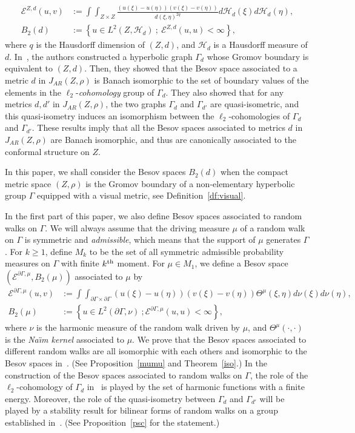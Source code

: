 \documentclass[AHL,Unicode,longabstracts,published]{cedram}
\newcommand{\ce}{\mathcal{E}}
\newcommand{\ch}{\mathcal{H}}
\begin{document}
\begin{align*}
\ce^{Z,d}(u,v)&:=\int\int_{Z\times Z}\frac{(u(\xi)-u(\eta))(v(\xi)-v(\eta))}{d(\xi,\eta)^{2q}} d\ch_{d}(\xi)d\ch_{d}(\eta),\\
B_2(d)&:=\left\{u\in L^2(Z,\ch_{d})\ ;\ \ce^{Z,d}(u,u)<\infty\right\},
\end{align*}
where $q$ is the Hausdorff dimension of $(Z,d)$, and $\ch_{d}$ is a Hausdorff measure of $d$. In~\cite{BP}, the authors constructed a hyperbolic graph $\Gamma_{d}$ whose Gromov boundary is equivalent to $(Z,d)$. Then, they showed that the Besov space associated to a metric $d$ in $J_{AR}(Z,\rho)$ is Banach isomorphic to the set of boundary values of the elements in the $\ell_2$-\emph{cohomology} group of $\Gamma_{d}$. They also showed that for any metrics $d,d'$ in $J_{AR}(Z,\rho)$, the two graphs $\Gamma_{d}$ and $\Gamma_{d'}$ are quasi-isometric, and this quasi-isometry induces an isomorphism between the $\ell_2$-cohomologies of $\Gamma_{d}$ and $\Gamma_{d'}$. These results imply that all the Besov spaces associated to metrics $d$ in $J_{AR}(Z,\rho)$ are Banach isomorphic, and thus are canonically associated to the conformal structure on $Z$.



In this paper, we shall consider the Besov spaces $B_2(d)$ when the compact metric space $(Z,\rho)$ is the Gromov boundary of a non-elementary hyperbolic group $\Gamma$ equipped with a visual metric, see Definition~\ref{df:visual}.


In the first part of this paper, we also define Besov spaces associated to random walks on $\Gamma$. We will always assume that the driving measure $\mu$ of a random walk on $\Gamma$ is symmetric and \emph{admissible}, which means that the support of $\mu$ generates $\Gamma$. For $k\geq1$, define $M_k$ to be the set of all symmetric admissible probability measures on $\Gamma$ with finite $k^{\rm th}$ moment. For $\mu\in M_1$, we define a Besov space $(\ce^{\partial\Gamma,\mu},B_2(\mu))$ associated to $\mu$ by
\begin{align*}
\ce^{\partial\Gamma,\mu}(u,v)&:=\int\int_{\partial\Gamma\times \partial\Gamma} (u(\xi)-u(\eta))(v(\xi)-v(\eta)) \Theta^\mu(\xi,\eta) d\nu(\xi)d\nu(\eta),\\
B_2(\mu)&:=\left\{u\in L^2(\partial\Gamma,\nu)\ ;\ce^{\partial\Gamma,\mu}(u,u)<\infty\right\},
\end{align*}
where $\nu$ is the harmonic measure of the random walk driven by $\mu$, and $\Theta^\mu(\cdot,\cdot)$ is the \emph{Na{\"\i}m kernel} associated to $\mu$. We prove that the Besov spaces associated to different random walks are all isomorphic with each others and isomorphic to the Besov spaces in~\cite{BP}. (See Proposition~\ref{mumu} and Theorem~\ref{iso}.) In the construction of the Besov spaces associated to random walks on $\Gamma$, the role of the $\ell_2$-cohomology of $\Gamma_{d}$ in~\cite{BP} is played by the set of harmonic functions with a finite energy. Moreover, the role of the quasi-isometry between $\Gamma_{d}$ and $\Gamma_{d'}$ will be played by a stability result for bilinear forms of random walks on a group established in~\cite{PSC}. (See Proposition~\ref{psc} for the statement.)
\end{document}
